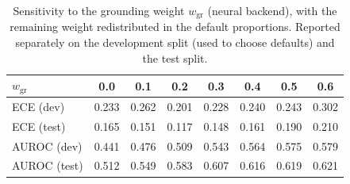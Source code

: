 \begin{table}[t]
  \caption{Sensitivity to the grounding weight $w_{\mathrm{gr}}$ (neural backend), with the remaining weight redistributed in the default proportions. Reported separately on the development split (used to choose defaults) and the test split.}
  \label{tab:sweep-neural}
  \footnotesize
  \setlength{\tabcolsep}{3pt}
  \begin{tabular}{lccccccc}
    \toprule
    $w_{\mathrm{gr}}$ & 0.0 & 0.1 & 0.2 & 0.3 & 0.4 & 0.5 & 0.6 \\
    \midrule
    ECE (dev) & 0.233 & 0.262 & 0.201 & 0.228 & 0.240 & 0.243 & 0.302 \\
    ECE (test) & 0.165 & 0.151 & 0.117 & 0.148 & 0.161 & 0.190 & 0.210 \\
    AUROC (dev) & 0.441 & 0.476 & 0.509 & 0.543 & 0.564 & 0.575 & 0.579 \\
    AUROC (test) & 0.512 & 0.549 & 0.583 & 0.607 & 0.616 & 0.619 & 0.621 \\
    \bottomrule
  \end{tabular}
\end{table}
